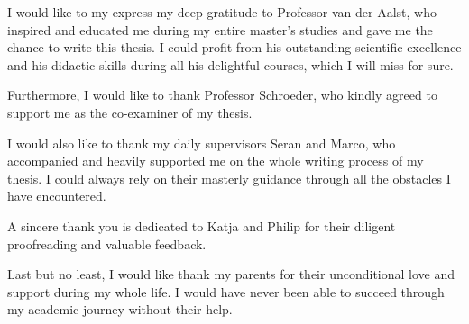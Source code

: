 I would like to my express my deep gratitude to Professor van der Aalst, who inspired and educated me during my entire master's studies and gave me the chance to write this thesis.
I could profit from his outstanding scientific excellence and his didactic skills during all his delightful courses, which I will miss for sure.

Furthermore, I would like to thank Professor Schroeder, who kindly agreed to support me as the co-examiner of my thesis.

I would also like to thank my daily supervisors Seran and Marco, who accompanied and heavily supported me on the whole writing process of my thesis.
I could always rely on their masterly guidance through all the obstacles I have encountered.

A sincere thank you is dedicated to Katja and Philip for their diligent proofreading and valuable feedback.

Last but no least, I would like thank my parents for their unconditional love and support during my whole life.
I would have never been able to succeed through my academic journey without their help.